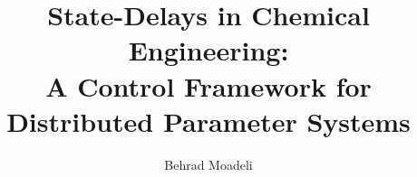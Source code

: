 \documentclass[
	pdfa,
	oneside,
	chapterbib,
	saychapapp,
	fancyheaders]{ualberta}
\title{State-Delays in Chemical Engineering: \\A Control Framework for Distributed Parameter Systems}                         %
\author{Behrad Moadeli}                   %
\begin{document}
	\maketitle                   %
	\makeabstract                %
	\makepreface                 %
		\makededication             %
	\acknowledgements            %

	\onehalfspacing              %

	\tableofcontents             %
	\listoftables                %
	\listoffigures               %
	\listofplates                %
	\listofsymbols               %
	\abbreviations               %
	\glsaddall                   %
	\generateglossary            %


	\bodyoftext %

	\truedoublespacing     %

%
% 
\end{document}
